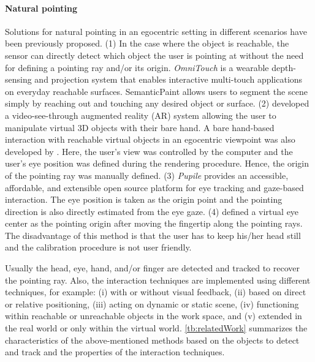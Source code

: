\paragraph{Natural pointing} Solutions for natural pointing in an egocentric setting in different scenarios have been previously proposed. 
(1) In the case where the object is reachable, the sensor can directly detect which object the user is pointing at without the need for defining a pointing ray and/or its origin.  \textit{OmniTouch} \citep{Harrison2011} is a wearable depth-sensing and projection system that enables interactive multi-touch applications on everyday reachable surfaces.  
SemanticPaint \citep{Valentin2015b} allows users to segment the scene simply by reaching out and touching any desired object or surface. 
(2) \citet{Ha2014} developed a video-see-through augmented reality (AR) system allowing the user to manipulate virtual 3D objects with their bare hand. A bare hand-based interaction with reachable virtual objects in an egocentric viewpoint was also developed by  \citet{Jang2015}.
Here, the user's view was controlled by the computer and the user's eye position was defined during the rendering procedure. Hence, the origin of the pointing ray was manually defined. 
(3) \textit{Pupile} \citep{Kassner2014} provides an accessible, affordable, and extensible open source platform for eye tracking and gaze-based interaction. The eye position is taken as the origin point and the pointing direction is also directly estimated from the eye gaze. 
(4) \citet{ma2015ismar} defined a virtual eye center as the pointing origin after moving the fingertip along the pointing rays. %
The disadvantage of this method is that the user has to keep his/her head still and the calibration procedure is not user friendly. 

Usually the head, eye, hand, and/or finger are detected and tracked to recover the pointing ray. Also, the interaction techniques are implemented using different techniques, for example: (i) with or without visual feedback, (ii) based on direct or relative positioning, (iii) acting on dynamic or static scene, (iv) {functioning} within reachable or unreachable objects in the work space, and (v) extended in the real world or only within the virtual world. 
\tablename{ \ref{tb:relatedWork}} summarizes the characteristics of the above-mentioned methods based on the objects to detect and track and the properties of the interaction techniques. 

